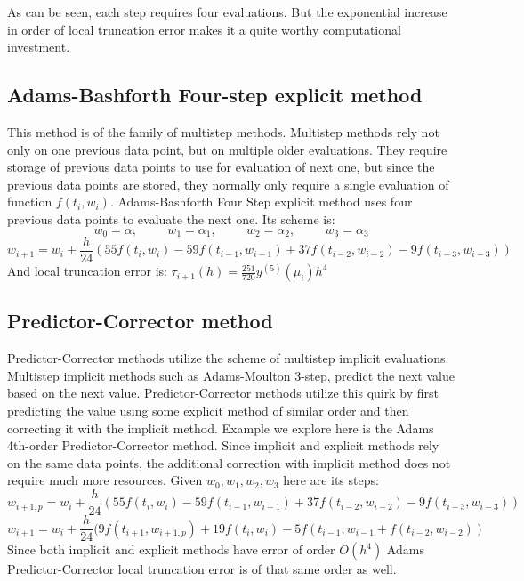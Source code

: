 \documentclass[11pt]{article}	%
\begin{document}
As can be seen, each step requires four evaluations. But the exponential increase in order of 
local truncation error makes it a quite worthy computational investment. 

\subsection{Adams-Bashforth Four-step explicit method}
This method is of the family of multistep methods. Multistep methods rely not only on one previous data point, but on multiple older evaluations. They require storage of previous data points to use for evaluation of next one, but since the previous data points are stored, they normally only require a single evaluation of function $f(t_i,w_i)$. Adams-Bashforth Four Step explicit method uses four previous data points to evaluate the next one. Its scheme is:
$$w_0 = \alpha , \hspace{1cm} w_1 = \alpha _1, \hspace{1cm} w_2 = \alpha _2, \hspace{1cm} w_3 = \alpha _3$$
$$w_{i+1} = w_i + \frac{h}{24}(55f(t_i,w_i) - 59f(t_{i-1}, w_{i-1}) + 37f(t_{i-2}, w_{i-2}) - 9f(t_{i-3}, w_{i-3}))$$
And local truncation error is: $\tau _{i+1}(h) = \frac{251}{720}y^{(5)}(\mu _i)h^4$

\subsection{Predictor-Corrector method}
Predictor-Corrector methods utilize the scheme of multistep implicit evaluations. Multistep implicit methods such as Adams-Moulton 3-step, predict the next value based on the next value. 
Predictor-Corrector methods utilize this quirk by first predicting the value using some explicit 
method of similar order and then correcting it with the implicit method. Example we explore here is
the Adams 4th-order Predictor-Corrector method. Since implicit and explicit methods rely on the same data points, the additional correction with implicit method does not require much more
resources. Given $w_0, w_1, w_2, w_3$ here are its steps: 
$$w_{i+1,p} = w_i + \frac{h}{24}(55f(t_i,w_i) - 59f(t_{i-1}, w_{i-1}) + 37f(t_{i-2}, w_{i-2}) - 9f(t_{i-3}, w_{i-3}))$$
$$w_{i+1} = w_i + \frac{h}{24}(9f(t_{i+1}, w_{i+1, p}) + 19f(t_i, w_i) - 5f(t_{i-1}, w_{i-1} + f(t_{i-2}, w_{i-2}))$$
Since both implicit and explicit methods have error of order $O(h^4)$ Adams Predictor-Corrector local truncation error is of that same order as well. 
\end{document}
